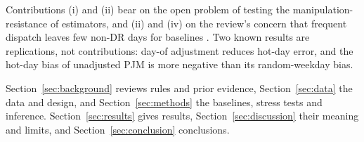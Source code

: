 Contributions (i) and (ii) bear on the open problem of testing the manipulation-resistance of estimators, and (ii) and (iv) on the review's concern that frequent dispatch leaves few non-DR days for baselines \citep{li2026review}. Two known results are replications, not contributions: day-of adjustment reduces hot-day error, and the hot-day bias of unadjusted PJM is more negative than its random-weekday bias.

Section~\ref{sec:background} reviews rules and prior evidence, Section~\ref{sec:data} the data and design, and Section~\ref{sec:methods} the baselines, stress tests and inference. Section~\ref{sec:results} gives results, Section~\ref{sec:discussion} their meaning and limits, and Section~\ref{sec:conclusion} conclusions.

